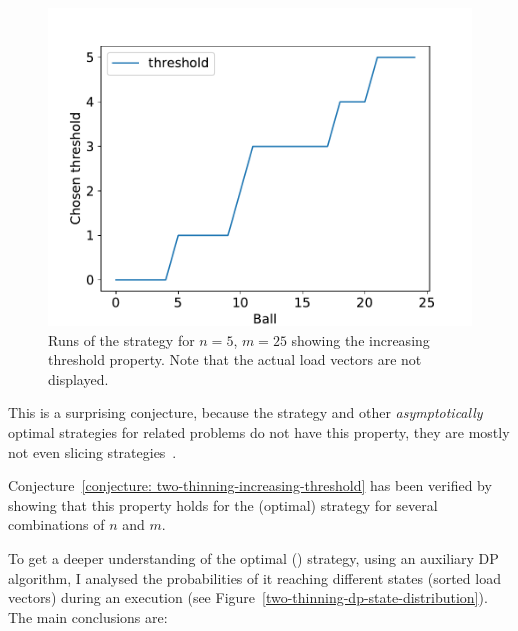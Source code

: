 \begin{figure}
\begin{minipage}[t]{.32\linewidth}
  \includegraphics[scale=0.36]{Chapter4/Figs/dp_increasing_threshold_3.pdf}
\end{minipage}
\caption{Runs of the \DP strategy for $n=5$, $m=25$ showing the increasing threshold property. Note that the actual load vectors are not displayed.}
\label{dp-increasing-threshold}
\end{figure}


This is a surprising conjecture, because the \Threshold strategy and other \textit{asymptotically} optimal strategies for related problems do not have this property, they are mostly not even slicing strategies~\cite{feldheim2021longtermthinning}.


\begin{remark}
Conjecture~\ref{conjecture: two-thinning-increasing-threshold} has been verified by showing that this property holds for the (optimal) \DP strategy for several combinations of $n$ and $m$. 
\end{remark}


To get a deeper understanding of the optimal (\DP) strategy, using an auxiliary DP algorithm, I analysed the probabilities of it reaching different states (sorted load vectors) during an execution (see Figure~\ref{two-thinning-dp-state-distribution}). The main conclusions are:

